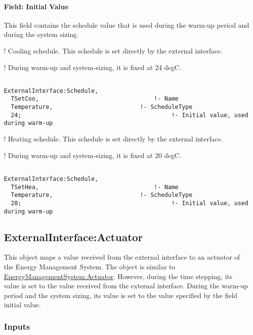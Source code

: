 \paragraph{Field: Initial Value}\label{field-initial-value}

This field contains the schedule value that is used during the warm-up period and during the system sizing.

! Cooling schedule. This schedule is set directly by the external interface.

! During warm-up and system-sizing, it is fixed at 24 degC.

\begin{lstlisting}

ExternalInterface:Schedule,
  TSetCoo,                                 !- Name
  Temperature,                         !- ScheduleType
  24;                                           !- Initial value, used during warm-up
\end{lstlisting}

! Heating schedule. This schedule is set directly by the external interface.

! During warm-up and system-sizing, it is fixed at 20 degC.

\begin{lstlisting}

ExternalInterface:Schedule,
  TSetHea,                                 !- Name
  Temperature,                         !- ScheduleType
  20;                                           !- Initial value, used during warm-up
\end{lstlisting}

\subsection{ExternalInterface:Actuator}\label{externalinterfaceactuator}

This object maps a value received from the external interface to an actuator of the Energy Management System. The object is similar to \hyperref[energymanagementsystemactuator]{EnergyManagementSystem:Actuator}. However, during the time stepping, its value is set to the value received from the external interface. During the warm-up period and the system sizing, its value is set to the value specified by the field initial value.

\subsubsection{Inputs}\label{inputs-2-015}

